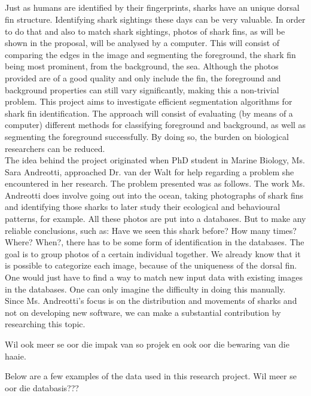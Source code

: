 \documentclass[a4paper,10pt]{article}
\begin{document}
\subsection{}
Just as humans are identified by their fingerprints, sharks have an unique
dorsal fin structure.  Identifying shark sightings these days can be very
valuable.  In order to do that and also to match shark sightings, photos of
shark fins, as will be shown in the proposal, will be analysed by a computer. 
This will consist of comparing the edges in the image and segmenting the
foreground, the shark fin being most prominent,  from the background, the sea. 
Although the photos provided are of a good quality and only include the fin, the
foreground and background properties can still vary significantly, making this a
non-trivial problem.  This project aims to investigate efficient segmentation
algorithms for shark fin identification.  The approach will consist of
evaluating (by means of a computer) different methods for classifying foreground
and background, as well as segmenting the foreground successfully.  By doing so,
the burden on biological researchers can be reduced.  \\

The idea behind the project originated when PhD
student in Marine Biology, Ms. Sara Andreotti, approached Dr. van der Walt for
help regarding a problem she encountered in her research.
The problem presented was
as follows.  The work Ms. Andreotti does involve going out into the ocean,
taking photographs of shark fins and identifying those sharks to later study
their ecological and behavioural
patterns, for example.
All these photos are put into a databases. But to
make any reliable conclusions, such as: Have we seen this shark before?  How
many
times? Where? When?, there has to be some form of identification in the
databases. 
The goal is to group photos of a certain individual together.  We
already know that it is possible to categorize each image, because of the
uniqueness of the dorsal fin.  One would just have to find a way to match new
input data with existing images in the databases.  One can only imagine the
difficulty in doing this manually. 
Since Ms. Andreotti's
focus is on the distribution and movements of sharks and not on developing new
software, we can make a substantial contribution by researching this topic. 

Wil ook meer se oor die impak van so projek en ook oor die bewaring van die
haaie.

\newpage
Below are a few examples of the data used in this research project.  Wil meer se
oor die databasis???
\end{document}
